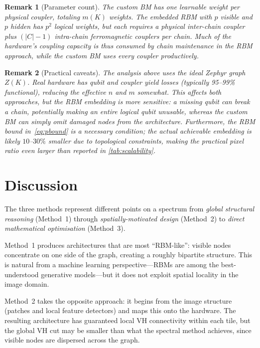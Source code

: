 \documentclass[11pt,a4paper]{article}
\newtheorem{remark}{Remark}
\begin{document}
\begin{remark}[Parameter count]
The custom BM has one learnable weight per physical coupler, totaling $m(K)$ weights.  The embedded RBM with $p$ visible and $p$ hidden has $p^2$ logical weights, but each requires a physical inter-chain coupler plus $(|C|-1)$ intra-chain ferromagnetic couplers per chain.  Much of the hardware's coupling capacity is thus consumed by chain maintenance in the RBM approach, while the custom BM uses every coupler productively.
\end{remark}

\begin{remark}[Practical caveats]\label{rem:caveats}
The analysis above uses the \emph{ideal} Zephyr graph $Z(K)$.  Real hardware has qubit and coupler yield losses (typically 95--99\% functional), reducing the effective $n$ and $m$ somewhat.  This affects both approaches, but the RBM embedding is more sensitive: a missing qubit can break a chain, potentially making an entire logical qubit unusable, whereas the custom BM can simply omit damaged nodes from the architecture.  Furthermore, the RBM bound in~\eqref{eq:pbound} is a necessary condition; the actual achievable embedding is likely $10$--$30\%$ smaller due to topological constraints, making the practical pixel ratio even larger than reported in \cref{tab:scalability}.
\end{remark}


\section{Discussion}\label{sec:discussion}

The three methods represent different points on a spectrum from \emph{global structural reasoning} (Method~1) through \emph{spatially-motivated design} (Method~2) to \emph{direct mathematical optimisation} (Method~3).

Method~1 produces architectures that are most ``RBM-like'': visible nodes concentrate on one side of the graph, creating a roughly bipartite structure.  This is natural from a machine learning perspective---RBMs are among the best-understood generative models---but it does not exploit spatial locality in the image domain.

Method~2 takes the opposite approach: it begins from the image structure (patches and local feature detectors) and maps this onto the hardware.  The resulting architecture has guaranteed local VH connectivity within each tile, but the global VH cut may be smaller than what the spectral method achieves, since visible nodes are dispersed across the graph.
\end{document}
